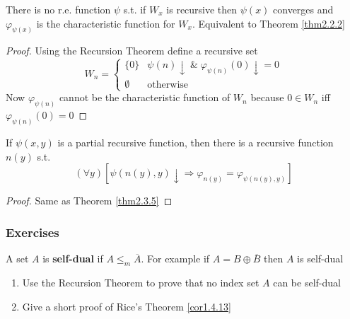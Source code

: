 \documentclass[11pt]{article}
\begin{document}
\begin{theorem}[]
\label{thm2.3.6}
There is no r.e. function \(\psi\) s.t. if \(W_x\) is recursive then \(\psi(x)\)
converges and \(\varphi_{\psi(x)}\) is the characteristic function for
\(W_x\). Equivalent to Theorem \ref{thm2.2.2}
\end{theorem}

\begin{proof}
Using the Recursion Theorem define a recursive set
\begin{equation*}
W_n=
\begin{cases}
\{0\}&\psi(n)\downarrow\;\&\;
\varphi_{\psi(n)}(0)\downarrow=0\\
\emptyset&\text{otherwise}
\end{cases}
\end{equation*}
Now \(\varphi_{\psi(n)}\) cannot be the characteristic function of \(W_n\)
because \(0\in W_n\) iff \(\varphi_{\psi(n)}(0)=0\)
\end{proof}

\begin{theorem}[]
\label{thm2.3.7}
If \(\psi(x,y)\) is a partial recursive function, then there is a recursive
function \(n(y)\) s.t.
\begin{equation*}
(\forall y)[\psi(n(y),y)\downarrow\Longrightarrow\varphi_{n(y)}=\varphi_{\psi(n(y),y)}]
\end{equation*}
\end{theorem}

\begin{proof}
Same as Theorem \ref{thm2.3.5}
\end{proof}
\subsubsection{Exercises}
\label{sec:orgcdef776}
\begin{exercise}
\label{ex2.3.8}
A set \(A\) is \textbf{self-dual} if \(A\le_m\overbar{A}\). For example if
\(A=B\oplus\overbar{B}\) then \(A\) is self-dual
\begin{enumerate}
\item Use the Recursion Theorem to prove that no index set \(A\) can be self-dual
\item Give a short proof of Rice's Theorem \ref{cor1.4.13}
\end{enumerate}
\end{exercise}
\end{document}
